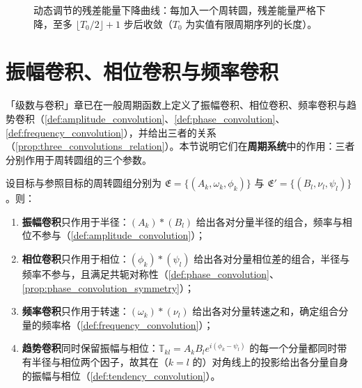 \begin{figure}[htbp]
\centering
{}
\caption{动态调节的残差能量下降曲线：每加入一个周转圆，残差能量严格下降，至多 $\lfloor T_0/2\rfloor+1$ 步后收敛（$T_0$ 为实值有限周期序列的长度）。}
\label{fig:ps_adaptive_convergence}
\end{figure}

\section{振幅卷积、相位卷积与频率卷积}\label{sec:ps_convolutions}

「级数与卷积」章已在一般周期函数上定义了振幅卷积、相位卷积、频率卷积与趋势卷积（\cref{def:amplitude_convolution}、\cref{def:phase_convolution}、\cref{def:frequency_convolution}），并给出三者的关系（\cref{prop:three_convolutions_relation}）。本节说明它们在\textbf{周期系统}中的作用：三者分别作用于周转圆组的三个参数。

\begin{theorem}[三类卷积在周转圆组上的作用]\label{thm:ps_convolution_action}
设目标与参照目标的周转圆组分别为 $\mathfrak{E}=\{(A_k,\omega_k,\phi_k)\}$ 与 $\mathfrak{E}'=\{(B_l,\nu_l,\psi_l)\}$。则：
\begin{enumerate}[label=(\roman*)]
    \item \textbf{振幅卷积}只作用于半径：$(A_k)\ast(B_l)$ 给出各对分量半径的组合，频率与相位不参与（\cref{def:amplitude_convolution}）；
    \item \textbf{相位卷积}只作用于相位：$(\phi_k)\ast(\psi_l)$ 给出各对分量相位差的组合，半径与频率不参与，且满足共轭对称性（\cref{def:phase_convolution}、\cref{prop:phase_convolution_symmetry}）；
    \item \textbf{频率卷积}只作用于转速：$(\omega_k)\ast(\nu_l)$ 给出各对分量转速之和，确定组合分量的频率格（\cref{def:frequency_convolution}）；
    \item \textbf{趋势卷积}同时保留振幅与相位：$\mathbb T_{kl}=A_kB_le^{i(\phi_k-\psi_l)}$ 的每一个分量都同时带有半径与相位两个因子，故其在（$k=l$ 的）对角线上的投影给出各分量自身的振幅与相位（\cref{def:tendency_convolution}）。
\end{enumerate}
\end{theorem}

